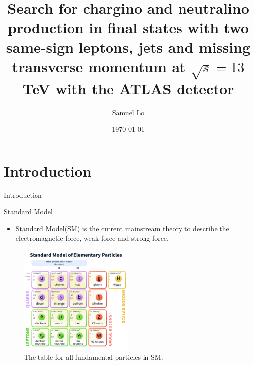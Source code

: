 \documentclass[mathserif,serif]{beamer}
\title[Oral Presentation]{Search for chargino and neutralino production in final states with two same-sign leptons, jets and missing transverse momentum at $\sqrt{s} = 13$ TeV with the ATLAS detector}
\author[]
{
Samuel Lo \inst{1}
}
\institute[]
{
\inst{1}
The University of Hong Kong
}
\date[]{\today}
\begin{document}
\frame{\titlepage}
\frame{\tableofcontents}

\section{Introduction}
\begin{frame}
\begin{center}
\huge
Introduction
\end{center}
\end{frame}

\begin{frame}{Standard Model}
\begin{itemize}
\item Standard Model(SM) is the current mainstream theory to describe the electromagnetic force, weak force and strong force.
\end{itemize}

\begin{figure}
\centering
\includegraphics[width=0.5\textwidth]{data/photo/theory/SM_particles.png}
\caption{The table for all fundamental particles in SM.}
\end{figure}
\end{frame}
\end{document}
